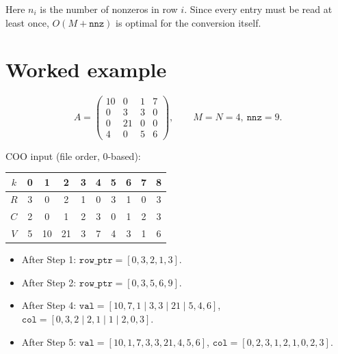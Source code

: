 \documentclass[11pt,a4paper]{article}
\newcommand{\id}[1]{\texttt{#1}}
\begin{document}
\noindent Here $n_i$ is the number of nonzeros in row $i$. Since every entry
must be read at least once, $O(M + \id{nnz})$ is optimal for the
conversion itself.

\section{Worked example}

\[
A = \begin{pmatrix}
10 & 0 & 1 & 7 \\
0 & 3 & 3 & 0 \\
0 & 21 & 0 & 0 \\
4 & 0 & 5 & 6
\end{pmatrix},
\qquad M = N = 4,\ \id{nnz} = 9.
\]

\noindent COO input (file order, 0-based):
\begin{center}
\begin{tabular}{c|ccccccccc}
$k$ & 0 & 1 & 2 & 3 & 4 & 5 & 6 & 7 & 8 \\
\hline
$R$ & 3 & 0 & 2 & 1 & 0 & 3 & 1 & 0 & 3 \\
$C$ & 2 & 0 & 1 & 2 & 3 & 0 & 1 & 2 & 3 \\
$V$ & 5 & 10 & 21 & 3 & 7 & 4 & 3 & 1 & 6 \\
\end{tabular}
\end{center}

\begin{itemize}
  \item After Step 1: $\id{row\_ptr} = [0, 3, 2, 1, 3]$.
  \item After Step 2: $\id{row\_ptr} = [0, 3, 5, 6, 9]$.
  \item After Step 4:
        $\id{val} = [10, 7, 1 \mid 3, 3 \mid 21 \mid 5, 4, 6]$,
        $\id{col} = [0, 3, 2 \mid 2, 1 \mid 1 \mid 2, 0, 3]$.
  \item After Step 5:
        $\id{val} = [10, 1, 7, 3, 3, 21, 4, 5, 6]$,
        $\id{col} = [0, 2, 3, 1, 2, 1, 0, 2, 3]$.
\end{itemize}
\end{document}
